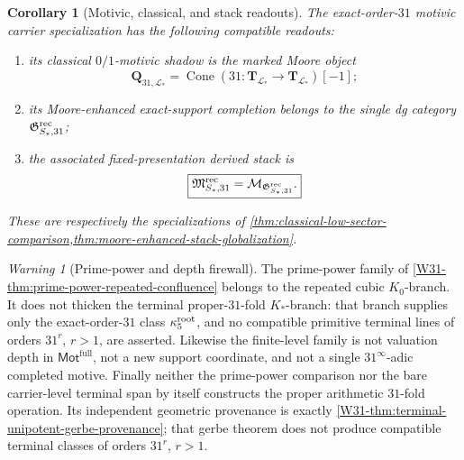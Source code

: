 \documentclass[11pt]{article}
\newtheorem{corollary}[theorem]{Corollary}
\theoremstyle{remark}
\newtheorem{warning}[theorem]{Warning}
\providecommand{\FullMot}{\mathsf{Mot}^{\mathrm{full}}}
\begin{document}
\begin{corollary}[Motivic, classical, and stack readouts]
\label{W31-cor:motivic-classical-stack-readouts}
The exact-order-\(31\) motivic carrier specialization has the following
compatible readouts:
\begin{enumerate}[label=\textup{(\roman*)}]
\item its classical \(0/1\)-motivic shadow is the marked Moore object
      \[
       \boxed{
       \mathbf Q_{31,\mathscr L_*}
       =
       \operatorname{Cone}\!\left(
       31:\mathbf T_{\mathscr L_*}\to\mathbf T_{\mathscr L_*}
       \right)[-1];}
      \]
\item its Moore-enhanced exact-support completion belongs to the single dg
      category \(\mathfrak G^{\rm rec}_{S_*,31}\);
\item the associated fixed-presentation derived stack is
      \[
       \boxed{
       \mathfrak M^{\rm rec}_{S_*,31}
       =\mathcal M_{\mathfrak G^{\rm rec}_{S_*,31}}.}
      \]
\end{enumerate}
These are respectively the specializations of
\cref{thm:classical-low-sector-comparison,thm:moore-enhanced-stack-globalization}.
\end{corollary}

\begin{warning}[Prime-power and depth firewall]
\label{W31-warn:prime-power-motivic-firewall}
The prime-power family of
\cref{W31-thm:prime-power-repeated-confluence} belongs to the repeated cubic
\(K_0\)-branch.  It does not thicken the terminal proper-\(31\)-fold
\(K_*\)-branch: that branch supplies only the exact-order-\(31\) class
\(\kappa_5^{\rm root}\), and no compatible primitive terminal lines of orders
\(31^r\), \(r>1\), are asserted.  Likewise the finite-level family is not
valuation depth in \(\FullMot\), not a new support coordinate, and not a
single \(31^\infty\)-adic completed motive.  Finally neither the prime-power
comparison nor the bare carrier-level terminal span by itself constructs the
proper arithmetic \(31\)-fold operation.  Its independent geometric
provenance is exactly
\cref{W31-thm:terminal-unipotent-gerbe-provenance}; that gerbe theorem does not
produce compatible terminal classes of orders \(31^r\), \(r>1\).
\end{warning}
\end{document}
